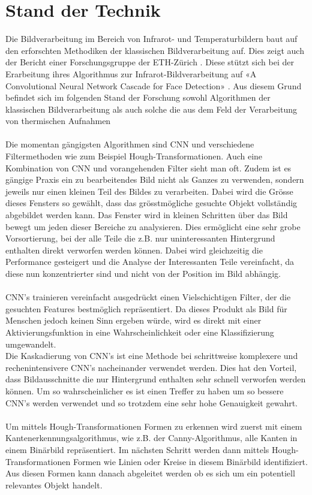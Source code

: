 \chapter{Stand der Technik}
\label{ch:StandDerTechnik}

Die Bildverarbeitung im Bereich von Infrarot- und Temperaturbildern baut auf den erforschten Methodiken der klassischen Bildverarbeitung auf. Dies zeigt auch der Bericht einer Forschungsgruppe der ETH-Zürich\parencite{gomez2018thermal} . Diese stützt sich bei der Erarbeitung ihres Algorithmus zur Infrarot-Bildverarbeitung auf «A Convolutional Neural Network Cascade for Face Detection»\parencite{li2015convolutional} . Aus diesem Grund befindet sich im folgenden Stand der Forschung sowohl Algorithmen der klassischen Bildverarbeitung als auch solche die aus dem Feld der Verarbeitung von thermischen Aufnahmen\\
\\
Die momentan gängigsten Algorithmen sind \gls{CNN} \parencite{li2015convolutional} und verschiedene Filtermethoden wie zum Beispiel Hough-Transformationen\parencite{ye2015new}. Auch eine Kombination von \gls{CNN} und vorangehenden Filter sieht man oft. Zudem ist es gängige Praxis ein zu bearbeitendes Bild nicht als Ganzes zu verwenden, sondern jeweils nur einen kleinen Teil des Bildes zu verarbeiten. Dabei wird die Grösse dieses Fensters so gewählt, dass das grösstmögliche gesuchte Objekt vollständig abgebildet werden kann. Das Fenster wird in kleinen Schritten über das Bild bewegt um jeden dieser Bereiche zu analysieren. Dies ermöglicht eine sehr grobe Vorsortierung, bei der alle Teile die z.B. nur uninteressanten Hintergrund enthalten direkt verworfen werden können. Dabei wird gleichzeitig die Performance gesteigert und die Analyse der Interessanten Teile vereinfacht, da diese nun konzentrierter sind und nicht von der Position im Bild abhängig.\\
\\
\gls{CNN}’s trainieren vereinfacht ausgedrückt einen Vielschichtigen Filter, der die gesuchten Features bestmöglich repräsentiert. Da dieses Produkt als Bild für Menschen jedoch keinen Sinn ergeben würde, wird es direkt mit einer Aktivierungsfunktion in eine Wahrscheinlichkeit oder eine Klassifizierung umgewandelt.\\
Die Kaskadierung von \gls{CNN}’s ist eine Methode bei schrittweise komplexere und rechenintensivere \gls{CNN}’s nacheinander verwendet werden. Dies hat den Vorteil, dass Bildausschnitte die nur Hintergrund enthalten sehr schnell verworfen werden können. Um so wahrscheinlicher es ist einen Treffer zu haben um so bessere \gls{CNN}’s werden verwendet und so trotzdem eine sehr hohe Genauigkeit gewahrt.\\
\\
Um mittels Hough-Transformationen Formen zu erkennen wird zuerst mit einem Kantenerkennungsalgorithmus, wie z.B. der Canny-Algorithmus, alle Kanten in einem Binärbild repräsentiert. Im nächsten Schritt werden dann mittels Hough-Transformationen Formen wie Linien oder Kreise in diesem Binärbild identifiziert. Aus diesen Formen kann danach abgeleitet werden ob es sich um ein potentiell relevantes Objekt handelt.



